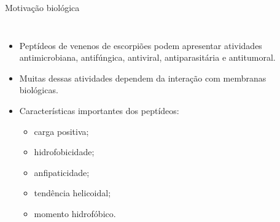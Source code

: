 \documentclass[aspectratio=169,10pt]{beamer}
\begin{document}
\begin{frame}{Motivação biológica}
\begin{columns}[T]
\begin{itemize}
  \item Peptídeos de venenos de escorpiões podem apresentar atividades antimicrobiana, antifúngica, antiviral, antiparasitária e antitumoral.
  \item Muitas dessas atividades dependem da interação com membranas biológicas.
  \item Características importantes dos peptídeos:
    \begin{itemize}
      \item carga positiva;
      \item hidrofobicidade;
      \item anfipaticidade;
      \item tendência helicoidal;
      \item momento hidrofóbico.
    \end{itemize}
\end{itemize}

\begin{center}
\end{center}
\end{columns}
\end{frame}
\end{document}
